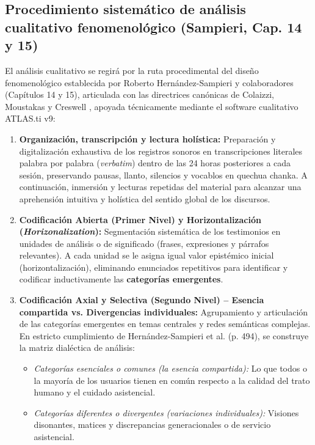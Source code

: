 \subsection{Procedimiento sistemático de análisis cualitativo fenomenológico (Sampieri, Cap. 14 y 15)}
\label{sec:4.7_analisis}
El análisis cualitativo se regirá por la ruta procedimental del diseño fenomenológico establecida por Roberto Hernández-Sampieri y colaboradores \cite{sampieri2018} (Capítulos 14 y 15), articulada con las directrices canónicas de Colaizzi, Moustakas \cite{moustakas1994} y Creswell \cite{creswell2013}, apoyada técnicamente mediante el software cualitativo ATLAS.ti v9:

\begin{enumerate}
    \item \textbf{Organización, transcripción y lectura holística:}
    Preparación y digitalización exhaustiva de los registros sonoros en transcripciones literales palabra por palabra (\textit{verbatim}) dentro de las 24 horas posteriores a cada sesión, preservando pausas, llanto, silencios y vocablos en quechua chanka. A continuación, inmersión y lecturas repetidas del material para alcanzar una aprehensión intuitiva y holística del sentido global de los discursos.
    
    \item \textbf{Codificación Abierta (Primer Nivel) y Horizontalización (\textit{Horizonalization}):}
    Segmentación sistemática de los testimonios en unidades de análisis o de significado (frases, expresiones y párrafos relevantes). A cada unidad se le asigna igual valor epistémico inicial (horizontalización), eliminando enunciados repetitivos para identificar y codificar inductivamente las \textbf{categorías emergentes}.
    
    \item \textbf{Codificación Axial y Selectiva (Segundo Nivel) -- Esencia compartida vs. Divergencias individuales:}
    Agrupamiento y articulación de las categorías emergentes en temas centrales y redes semánticas complejas. En estricto cumplimiento de Hernández-Sampieri et al. \cite{sampieri2018} (p. 494), se construye la matriz dialéctica de análisis:
    \begin{itemize}
        \item \textit{Categorías esenciales o comunes (la esencia compartida):} Lo que todos o la mayoría de los usuarios tienen en común respecto a la calidad del trato humano y el cuidado asistencial.
        \item \textit{Categorías diferentes o divergentes (variaciones individuales):} Visiones disonantes, matices y discrepancias generacionales o de servicio asistencial.
    \end{itemize}
    

\end{enumerate}
